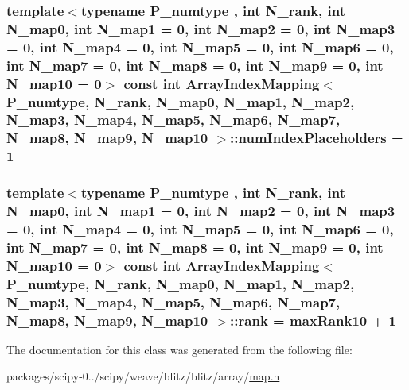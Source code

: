 \subsubsection[{num\+Index\+Placeholders}]{\setlength{\rightskip}{0pt plus 5cm}template$<$typename P\+\_\+numtype , int N\+\_\+rank, int N\+\_\+map0, int N\+\_\+map1 = 0, int N\+\_\+map2 = 0, int N\+\_\+map3 = 0, int N\+\_\+map4 = 0, int N\+\_\+map5 = 0, int N\+\_\+map6 = 0, int N\+\_\+map7 = 0, int N\+\_\+map8 = 0, int N\+\_\+map9 = 0, int N\+\_\+map10 = 0$>$ const int {\bf Array\+Index\+Mapping}$<$ P\+\_\+numtype, N\+\_\+rank, N\+\_\+map0, N\+\_\+map1, N\+\_\+map2, N\+\_\+map3, N\+\_\+map4, N\+\_\+map5, N\+\_\+map6, N\+\_\+map7, N\+\_\+map8, N\+\_\+map9, N\+\_\+map10 $>$\+::num\+Index\+Placeholders = 1\hspace{0.3cm}{\ttfamily [static]}}\label{classArrayIndexMapping_a6e2238603bb36c0af24dcbced06e7500}
\hypertarget{classArrayIndexMapping_a1c77aabbe08df8e77c010ab6792db64a}{}
\subsubsection[{rank}]{\setlength{\rightskip}{0pt plus 5cm}template$<$typename P\+\_\+numtype , int N\+\_\+rank, int N\+\_\+map0, int N\+\_\+map1 = 0, int N\+\_\+map2 = 0, int N\+\_\+map3 = 0, int N\+\_\+map4 = 0, int N\+\_\+map5 = 0, int N\+\_\+map6 = 0, int N\+\_\+map7 = 0, int N\+\_\+map8 = 0, int N\+\_\+map9 = 0, int N\+\_\+map10 = 0$>$ const int {\bf Array\+Index\+Mapping}$<$ P\+\_\+numtype, N\+\_\+rank, N\+\_\+map0, N\+\_\+map1, N\+\_\+map2, N\+\_\+map3, N\+\_\+map4, N\+\_\+map5, N\+\_\+map6, N\+\_\+map7, N\+\_\+map8, N\+\_\+map9, N\+\_\+map10 $>$\+::rank = {\bf max\+Rank10} + 1\hspace{0.3cm}{\ttfamily [static]}}\label{classArrayIndexMapping_a1c77aabbe08df8e77c010ab6792db64a}


The documentation for this class was generated from the following file\+:\begin{DoxyCompactItemize}
\item 
packages/scipy-\/0../scipy/weave/blitz/blitz/array/\hyperlink{map_8h}{map.\+h}\end{DoxyCompactItemize}
